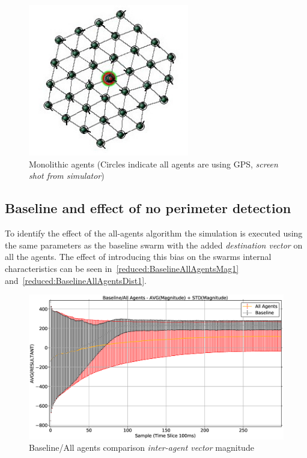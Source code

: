 \begin{figure}[H]
\begin{center}
\includegraphics[width=7cm]{CHAPTER-6/figures/Monolithic2}
\end{center}
\caption[Monolithic agents]{Monolithic agents (Circles indicate all agents are using GPS, \textit{screen shot from simulator}) \label{reduced:Monolithic1}}
\end{figure}

\subsection{Baseline and effect of no perimeter detection\label{section:compareBaselineNoPerimeter}}
To identify the effect of the all-agents algorithm the simulation is executed using the same parameters as the baseline swarm with the added \textit{destination vector} on all the agents. The effect of introducing this bias on the swarms internal characteristics can be seen in~\autoref{reduced:BaselineAllAgentsMag1} and~\autoref{reduced:BaselineAllAgentsDist1}.
\begin{figure}[H]
\begin{center}
\includegraphics[width=14cm]{CHAPTER-6/figures/BaselineAllAgentsMag1}
\end{center}
\caption{Baseline/All agents comparison \textit{inter-agent vector} magnitude\label{reduced:BaselineAllAgentsMag1}}
\end{figure}

